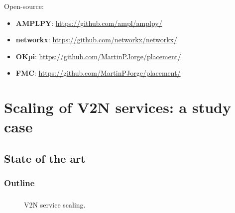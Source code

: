 \documentclass[aspectratio=169]{beamer}
\begin{document}
\begin{frame}
    \frametitle{\secname}
    \framesubtitle{\subsecname}
    Open-source:
    \begin{itemize}
        \item \textbf{AMPLPY}: \url{https://github.com/ampl/amplpy/}
        \item \textbf{networkx}: \url{https://github.com/networkx/networkx/}
        \item \textbf{OKpi}: \url{https://github.com/MartinPJorge/placement/}
        \item \textbf{FMC}: \url{https://github.com/MartinPJorge/placement/}
    \end{itemize}
\end{frame}







\section{Scaling of V2N services: a study case}
\subsection{State of the art}
\begin{frame}
    \frametitle{Outline}
    \tableofcontents[subsectionstyle=show/shaded/hide,sectionstyle=show/shaded]
\end{frame}



\begin{frame}
    \frametitle{\secname}
    \framesubtitle{\subsecname}

    \begin{figure}
        \caption{V2N service scaling.}
    \end{figure}

\end{frame}
\end{document}
